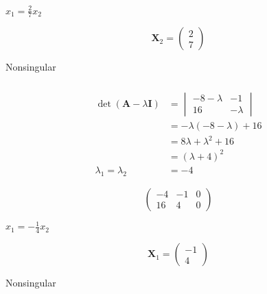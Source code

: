 \documentclass{article}
\begin{document}
$x_1 = \frac{2}{7} x_2$

\[\mathbf{X}_2 = \begin{pmatrix}
    2 \\
    7
  \end{pmatrix}\]

Nonsingular

\setcounter{subsubsection}{8}
\subsubsection{}

\begin{align*}
  \det (\mathbf{A} - \lambda \mathbf{I}) & = \begin{vmatrix}
                                               -8 - \lambda & -1       \\
                                               16           & -\lambda
                                             \end{vmatrix}      \\
                                         & = -\lambda (-8 - \lambda) + 16 \\
                                         & = 8 \lambda + \lambda^2 + 16   \\
                                         & = (\lambda + 4)^2              \\
  \lambda_1 = \lambda_2                  & = -4
\end{align*}

\[\left( \begin{array}{cc|c}
      -4 & -1 & 0 \\
      16 & 4  & 0
    \end{array} \right)\]

$x_1 = -\frac{1}{4} x_2$

\[\mathbf{X}_1 = \begin{pmatrix}
    -1 \\
    4
  \end{pmatrix}\]

Nonsingular

\setcounter{subsubsection}{10}
\subsubsection{}
\end{document}
